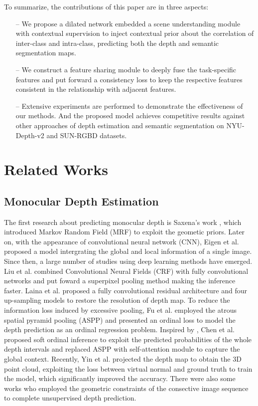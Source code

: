 \documentclass[sn-mathphys]{sn-jnl}
\theoremstyle{thmstyleone}\newtheorem{theorem}{Theorem}\newtheorem{proposition}[theorem]{Proposition}
\theoremstyle{thmstyletwo}\newtheorem{example}{Example}\newtheorem{remark}{Remark}
\theoremstyle{thmstylethree}\newtheorem{definition}{Definition}\usepackage[numbers,sort&compress]{natbib}
\begin{document}
To summarize, the contributions of this paper are in three aspects:

\begin{itemize}
	\item [--]
	We propose a dilated network embedded a scene understanding module with contextual supervision to inject contextual prior about the correlation of inter-class and intra-class, predicting both the depth and semantic segmentation maps.
	\item [--]
	We construct a feature sharing module to deeply fuse the task-specific features and put forward a consistency loss to keep the respective features consistent in the relationship with adjacent features. 
	\item [--]
	Extensive experiments are performed to demonstrate the effectiveness of our methods. And the proposed model achieves competitive results against other approaches of depth estimation and semantic segmentation on NYU-Depth-v2 and SUN-RGBD datasets. 
\end{itemize}

\section{Related Works}\label{sec2}

\subsection{Monocular Depth Estimation}
The first research about predicting monocular depth is Saxena's work \cite{saxena2005learning}, which introduced Markov Random Field (MRF) to exploit the geometic priors. Later on, with the appearance of convolutional neural network (CNN), Eigen et al. \cite{eigen2014depth} proposed a model intergrating the global and local information of a single image. Since then, a large number of studies using deep learning methods have emerged. Liu et al. \cite{Liu_2015} combined Convolutional Neural Fields (CRF) with fully convolutional networks and put foward a superpixel pooling method making the inference faster. Laina et al. \cite{Laina_2016} proposed a fully convolutional residual architecture and four up-sampling models to restore the resolution of depth map. To reduce the information loss induced by excessive pooling, Fu et al. \cite{Fu_2018} employed the atrous spatial pyramid pooling (ASPP) and presented an ordinal loss to model the depth prediction as an ordinal regression problem. Inspired by \cite{Fu_2018}, Chen et al. \cite{Chen_2021} proposed soft ordinal inference to exploit the predicted probabilities of the whole depth intervals and replaced ASPP with self-attention module to capture the global context. Recently, Yin et al. \cite{Yin_2019} projected the depth map to obtain the 3D point cloud, exploiting the loss between virtual normal and ground truth to train the model, which significantly improved the accuracy. There were also some works  \cite{Yin_2018,Yang_2018,Godard_2017} who employed the geometric constraints of the consective image sequence to complete unsupervised depth prediction. 
\end{document}
